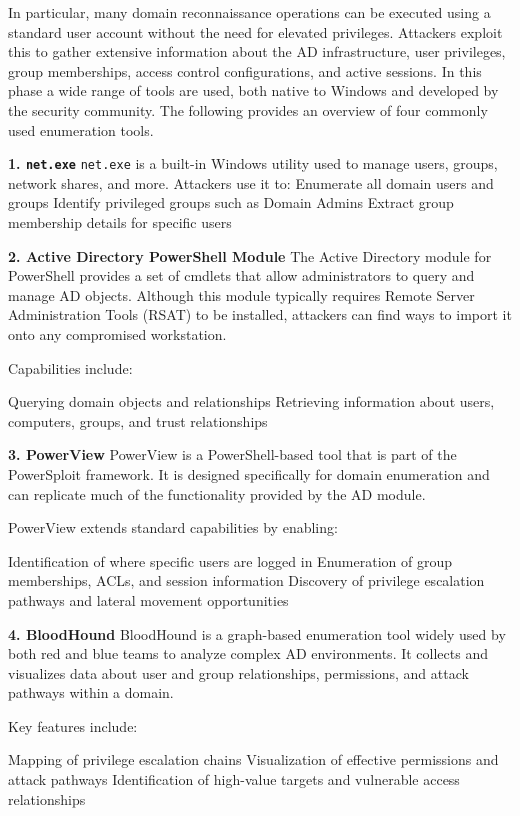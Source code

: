 {In particular, many domain reconnaissance operations can be executed using a standard user account without the need for elevated privileges. Attackers exploit this to gather extensive information about the AD infrastructure, user privileges, group memberships, access control configurations, and active sessions. In this phase a wide range of tools are used, both native to Windows and developed by the security community. The following provides an overview of four commonly used enumeration tools.

\textbf{1. \texttt{net.exe}}
\texttt{net.exe} is a built-in Windows utility used to manage users, groups, network shares, and more. Attackers use it to:
Enumerate all domain users and groups
Identify privileged groups such as Domain Admins
Extract group membership details for specific users

\textbf{2. Active Directory PowerShell Module}
The Active Directory module for PowerShell provides a set of cmdlets that allow administrators to query and manage AD objects. Although this module typically requires Remote Server Administration Tools (RSAT) to be installed, attackers can find ways to import it onto any compromised workstation.

Capabilities include:

Querying domain objects and relationships
Retrieving information about users, computers, groups, and trust relationships

\textbf{3. PowerView}
PowerView is a PowerShell-based tool that is part of the PowerSploit framework. It is designed specifically for domain enumeration and can replicate much of the functionality provided by the AD module.

PowerView extends standard capabilities by enabling:

Identification of where specific users are logged in
Enumeration of group memberships, ACLs, and session information
Discovery of privilege escalation pathways and lateral movement opportunities

\textbf{4. BloodHound}
BloodHound is a graph-based enumeration tool widely used by both red and blue teams to analyze complex AD environments. It collects and visualizes data about user and group relationships, permissions, and attack pathways within a domain.

Key features include:

Mapping of privilege escalation chains
Visualization of effective permissions and attack pathways 
Identification of high-value targets and vulnerable access relationships

}
